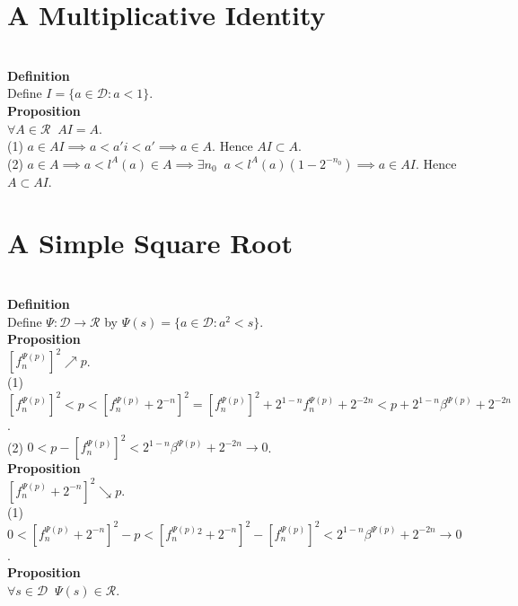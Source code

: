 \documentclass{article}
\newcommand{\targetset}{ \mathscr{R}}
\newcommand{\sourceset}{ \mathscr{D}}
\newcommand{\leaper}{l}
\newcommand{\elt}{a}
\newcommand{\altelt}{s}
\newcommand{\rooter}{\Psi}
\newcommand{\umbrella}{\beta}
\begin{document}
\section{A Multiplicative Identity}\\



\textbf{Definition}\\
Define $I = \{\elt \in \sourceset : \elt < 1 \}$.\\

\textbf{Proposition}\\
$\forall A \in \targetset \;\; AI = A$.\\

(1) $\elt \in AI \implies \elt < a'i < a' \implies \elt \in A$. Hence $AI \subset A$.\\
(2) $\elt \in A \implies \elt < \leaper^A(\elt) \in A \implies \exists n_0 \;\; \elt < \leaper^A(\elt)(1-2^{-n_0}) \implies a \in AI.$ Hence $A \subset AI$. \\

\section{A Simple Square Root}\\

\textbf{Definition}\\
Define $\rooter : \sourceset \to \targetset$ by $\rooter(\altelt) = \{\elt \in \sourceset: \elt^2 < \altelt\}.$\\ 

\textbf{Proposition}\\
$[f^{\rooter(p)}_n]^2 \nearrow p$.\\

(1) $[f^{\rooter(p)}_n]^2 < p < [ f^{\rooter(p)}_n + 2^{-n} ]^2 = [f^{\rooter(p)}_n]^2  + 2^{1-n} f^{\rooter(p)}_n +  2^{-2n} < p + 2^{1-n} \umbrella^{\rooter(p)} + 2^{-2n}$.\\
(2) $0 < p - [f^{\rooter(p)}_n]^2 < 2^{1-n} \umbrella^{\rooter(p)} + 2^{-2n} \to 0$.\\

\textbf{Proposition}\\
$[f^{\rooter(p)}_n +2^{-n}]^2 \searrow p$.\\

(1) $0 < [ f^{\rooter(p)}_n + 2^{-n} ]^2 - p < [ f^{\rooter(p)}_n^2 + 2^{-n} ]^2 -[f^{\rooter(p)}_n]^2 < 2^{1-n} \umbrella^{\rooter(p)} + 2^{-2n} \to 0$.\\

\textbf{Proposition}\\
$\forall \altelt \in \sourceset \;\; \rooter(\altelt) \in \targetset$.\\
\end{document}
